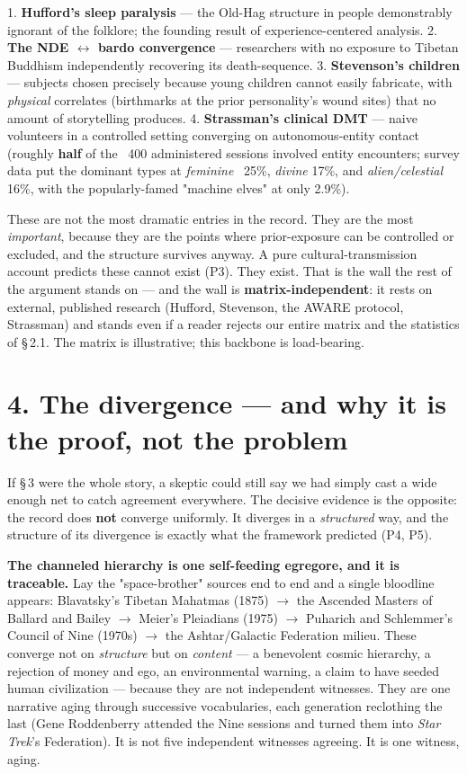 \documentclass[11pt]{article}
\begin{document}
1. \textbf{Hufford's sleep paralysis} --- the Old-Hag structure in people demonstrably ignorant of the folklore; the founding result of experience-centered analysis. 2. \textbf{The NDE $\leftrightarrow$ bardo convergence} --- researchers with no exposure to Tibetan Buddhism independently recovering its death-sequence. 3. \textbf{Stevenson's children} --- subjects chosen precisely because young children cannot easily fabricate, with \emph{physical} correlates (birthmarks at the prior personality's wound sites) that no amount of storytelling produces. 4. \textbf{Strassman's clinical DMT} --- naive volunteers in a controlled setting converging on autonomous-entity contact (roughly \textbf{half} of the ~400 administered sessions involved entity encounters; survey data put the dominant types at \emph{feminine} ~25\%, \emph{divine} 17\%, and \emph{alien/celestial} 16\%, with the popularly-famed "machine elves" at only 2.9\%).

These are not the most dramatic entries in the record. They are the most \emph{important}, because they are the points where prior-exposure can be controlled or excluded, and the structure survives anyway. A pure cultural-transmission account predicts these cannot exist (P3). They exist. That is the wall the rest of the argument stands on --- and the wall is \textbf{matrix-independent}: it rests on external, published research (Hufford, Stevenson, the AWARE protocol, Strassman) and stands even if a reader rejects our entire matrix and the statistics of \S\,2.1. The matrix is illustrative; this backbone is load-bearing.

\section*{4. The divergence --- and why it is the proof, not the problem}
If \S\,3 were the whole story, a skeptic could still say we had simply cast a wide enough net to catch agreement everywhere. The decisive evidence is the opposite: the record does \textbf{not} converge uniformly. It diverges in a \emph{structured} way, and the structure of its divergence is exactly what the framework predicted (P4, P5).

\textbf{The channeled hierarchy is one self-feeding egregore, and it is traceable.} Lay the "space-brother" sources end to end and a single bloodline appears: Blavatsky's Tibetan Mahatmas (1875) $\rightarrow$ the Ascended Masters of Ballard and Bailey $\rightarrow$ Meier's Pleiadians (1975) $\rightarrow$ Puharich and Schlemmer's Council of Nine (1970s) $\rightarrow$ the Ashtar/Galactic Federation milieu. These converge not on \emph{structure} but on \emph{content} --- a benevolent cosmic hierarchy, a rejection of money and ego, an environmental warning, a claim to have seeded human civilization --- because they are not independent witnesses. They are one narrative aging through successive vocabularies, each generation reclothing the last (Gene Roddenberry attended the Nine sessions and turned them into \emph{Star Trek}'s Federation). It is not five independent witnesses agreeing. It is one witness, aging.
\end{document}
